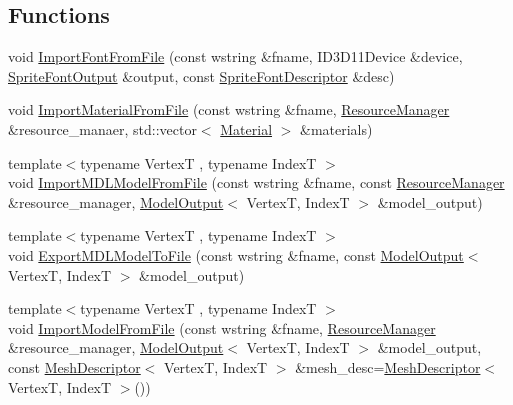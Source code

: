 \subsection*{Functions}
\begin{DoxyCompactItemize}
\item 
void \hyperlink{namespacemage_1_1rendering_1_1loader_a86772125cef425229a1adb3bc3a613f0}{Import\+Font\+From\+File} (const wstring \&fname, I\+D3\+D11\+Device \&device, \hyperlink{structmage_1_1rendering_1_1_sprite_font_output}{Sprite\+Font\+Output} \&output, const \hyperlink{classmage_1_1rendering_1_1_sprite_font_descriptor}{Sprite\+Font\+Descriptor} \&desc)
\item 
void \hyperlink{namespacemage_1_1rendering_1_1loader_a892629c31d316d20d8d1195181a0044c}{Import\+Material\+From\+File} (const wstring \&fname, \hyperlink{classmage_1_1rendering_1_1_resource_manager}{Resource\+Manager} \&resource\+\_\+manaer, std\+::vector$<$ \hyperlink{classmage_1_1rendering_1_1_material}{Material} $>$ \&materials)
\item 
{\footnotesize template$<$typename VertexT , typename IndexT $>$ }\\void \hyperlink{namespacemage_1_1rendering_1_1loader_a6d9c6f6d62c474e99a8a0b288b8c705f}{Import\+M\+D\+L\+Model\+From\+File} (const wstring \&fname, const \hyperlink{classmage_1_1rendering_1_1_resource_manager}{Resource\+Manager} \&resource\+\_\+manager, \hyperlink{structmage_1_1rendering_1_1_model_output}{Model\+Output}$<$ VertexT, IndexT $>$ \&model\+\_\+output)
\item 
{\footnotesize template$<$typename VertexT , typename IndexT $>$ }\\void \hyperlink{namespacemage_1_1rendering_1_1loader_a7f18d95a448d41b4879cf887e47a3b2c}{Export\+M\+D\+L\+Model\+To\+File} (const wstring \&fname, const \hyperlink{structmage_1_1rendering_1_1_model_output}{Model\+Output}$<$ VertexT, IndexT $>$ \&model\+\_\+output)
\item 
{\footnotesize template$<$typename VertexT , typename IndexT $>$ }\\void \hyperlink{namespacemage_1_1rendering_1_1loader_a984b926ea284fc89b88363c9d076d89e}{Import\+Model\+From\+File} (const wstring \&fname, \hyperlink{classmage_1_1rendering_1_1_resource_manager}{Resource\+Manager} \&resource\+\_\+manager, \hyperlink{structmage_1_1rendering_1_1_model_output}{Model\+Output}$<$ VertexT, IndexT $>$ \&model\+\_\+output, const \hyperlink{classmage_1_1rendering_1_1_mesh_descriptor}{Mesh\+Descriptor}$<$ VertexT, IndexT $>$ \&mesh\+\_\+desc=\hyperlink{classmage_1_1rendering_1_1_mesh_descriptor}{Mesh\+Descriptor}$<$ VertexT, IndexT $>$())

\end{DoxyCompactItemize}
